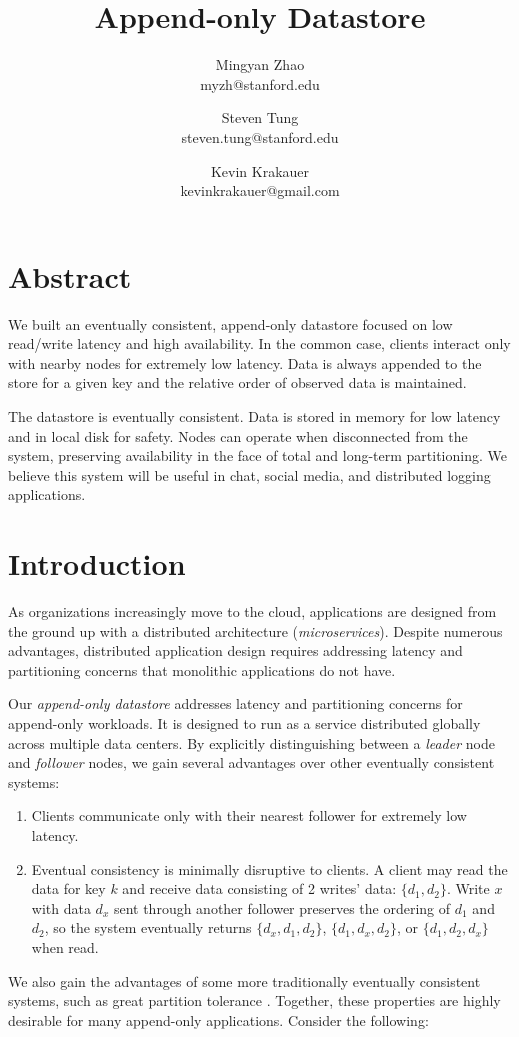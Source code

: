 \documentclass[11pt,english,twocolumn]{article}
\title{Append-only Datastore}
\author{
	Mingyan Zhao \\
    myzh@stanford.edu
	\and
	Steven Tung\\
    steven.tung@stanford.edu
	\and
	Kevin Krakauer\\
    kevinkrakauer@gmail.com
}
\date{}
\begin{document}
\maketitle


\section*{Abstract}
We built an eventually consistent, append-only datastore focused on low
read/write latency and high availability. In the common case, clients interact
only with nearby nodes for extremely low latency. Data is always appended to the 
store for a given key and the relative order of observed data is maintained.

The datastore is eventually consistent. Data is stored in memory for low latency
and in local disk for safety. Nodes can operate when disconnected from the
system, preserving availability in the face of total and long-term partitioning.
We believe this system will be useful in chat, social media, and distributed
logging applications.

\vspace{-0.4cm}
\section{Introduction}
\vspace{-0.2cm}
As organizations increasingly move to the cloud, applications are designed from
the ground up with a distributed architecture (\textit{microservices}). Despite
numerous advantages, distributed application design requires addressing latency
and partitioning concerns that monolithic applications do not have.

Our \textit{append-only datastore} addresses latency and partitioning concerns
for append-only workloads. It is designed to run as a service distributed
globally across multiple data centers. By explicitly distinguishing between a
\textit{leader} node and \textit{follower} nodes, we gain several advantages
over other eventually consistent systems:
\begin{enumerate}
	\item Clients communicate only with their nearest follower for extremely
		low latency. \vspace{-0.3cm}
	\item Eventual consistency is minimally disruptive to clients. A client
		may read the data for key $k$ and receive data consisting of 2
		writes' data: $\{d_1, d_2\}$. Write $x$ with data $d_x$ sent
		through another follower preserves the ordering of $d_1$ and
		$d_2$, so the system eventually returns $\{d_x, d_1, d_2\}$,
		$\{d_1, d_x, d_2\}$, or $\{d_1, d_2, d_x\}$ when read.
\end{enumerate}
We also gain the advantages of some more traditionally eventually consistent
systems, such as great partition tolerance \cite{Dynamo}. Together, these
properties are highly desirable for many append-only applications. Consider the
following:
\end{document}

